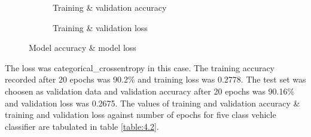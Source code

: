 \begin{figure}[htbp]
    \centering
    \begin{subfigure}[t]{0.45\textwidth}
        \caption{Training \& validation accuracy}
        \label{fig:4.4a}
    \end{subfigure}
    \begin{subfigure}[t]{0.45\textwidth}
        \caption{Training \& validation loss}
        \label{fig:4.4b}
    \end{subfigure}
    \caption[]{Model accuracy \& model loss}
    \label{fig:4.6}
  \end{figure}
  The loss was categorical\_crossentropy in this case. 
  The training accuracy recorded after 20 epochs was 90.2\% and training
  loss was 0.2778. The test set was choosen as validation data and
  validation accuracy after 20 epochs 
  was 90.16\% and validation loss was 0.2675.
  The values of training
  and validation accuracy \& training and validation loss
  against number of epochs for five class vehicle classifier
  are tabulated in table \ref{table:4.2}.

